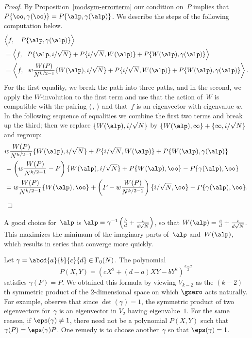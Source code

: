 \begin{proof}
By Proposition~\ref{modsym-errorterm} our condition on~$P$
implies that $P\{\oo,\gamma(\oo)\}= P\{\alp,\gamma(\alp)\}$. 
We describe the steps of the following computation below.\vspace{1ex}\\
\begin{align*}
&\Bigl\langle f,\quad P\{\alp,\gamma(\alp)\}\Bigr\rangle \\
  &=\left\langle 
  f,\quad\!\! P\{\alp,i/\sqrt{N}\} + P\{i/\sqrt{N},W(\alp)\}+P\{W(\alp),\gamma(\alp)\}
           \right\rangle \\
  &=\left\langle f,\quad\!\! w \frac{W(P)}{N^{k/2-1}}
        \{W(\alp),i/\sqrt{N}\} + P\{i/\sqrt{N},W(\alp)\}+P\{W(\alp),\gamma(\alp)\}
           \right\rangle.
      \end{align*}
For the first equality, we break the path into three paths,
and in the second, we apply the $W$-involution to the first
term and use that the action of~$W$ is compatible with
the pairing $\langle \,,\, \rangle$ and that~$f$ is an eigenvector
with eigenvalue $w$. 
In the following sequence of equalities we combine the first two terms
and break up the third; then we replace $\{ W(\alp), i/\sqrt{N}\}$ by
$\{W(\alp),\infty\}+\{\infty,i/\sqrt{N}\}$ and regroup:
\begin{align*}
&w \frac{W(P)}{N^{k/2-1}}
        \{W(\alp),i/\sqrt{N}\} + P\{i/\sqrt{N},W(\alp)\}+P\{W(\alp),\gamma(\alp)\}\\
 &= \left(w \frac{W(P)}{N^{k/2-1}}-P\right)
        \{W(\alp),i/\sqrt{N}\} +P\{W(\alp),\oo\} - P\{\gamma(\alp),\oo\}\\
  &=  w \frac{W(P)}{N^{k/2-1}}\{W(\alp),\oo\}
        +\left(P - w \frac{W(P)}{N^{k/2-1}}\right)\{i/\sqrt{N},\oo\} 
        -P\{\gamma(\alp),\oo\}.
\end{align*}
\end{proof}

A good choice for~$\alp$ is 
$\alp=\gamma^{-1}\left(\frac{b}{d}+\frac{i}{d\sqrt{N}}\right)$,
so that $W(\alp) = \frac{c}{d}+\frac{i}{d\sqrt{N}}$.
This maximizes the minimum of the imaginary parts 
of~$\alp$ and~$W(\alp)$, which results in series that converge
more quickly.

Let $\gamma=\abcd{a}{b}{c}{d}\in \Gamma_0(N)$.  
The polynomial
$$P(X,Y) = (cX^2 + (d-a)XY - bY^2)^{\frac{k-2}{2}}$$
satisfies $\gamma(P)=P$. 
We obtained this formula by viewing $V_{k-2}$ as
the $(k-2)$th symmetric product of the $2$-dimensional
space on which $\gzero$ acts naturally.  For example,
observe that since $\det(\gamma)=1$,
the symmetric product of two eigenvectors for~$\gamma$ is an eigenvector
in $V_{2}$ having eigenvalue~$1$. 
For the same reason, if $\eps(\gamma)\neq 1$, there need
not be a polynomial $P(X,Y)$ such that $\gamma(P)=\eps(\gamma) P$.
One remedy is to choose another~$\gamma$ so that $\eps(\gamma)=1$.

